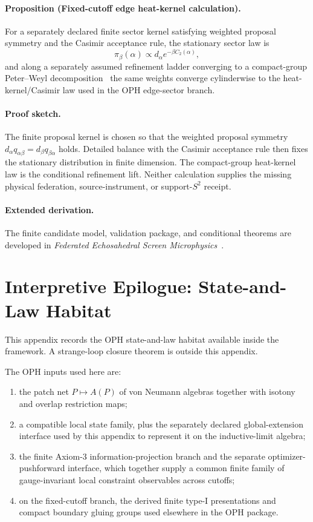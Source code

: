 \paragraph{Proposition (Fixed-cutoff edge heat-kernel calculation).}
For a separately declared finite sector kernel satisfying weighted proposal symmetry and the
Casimir acceptance rule, the stationary sector law is
\[
\pi_\beta(\alpha)\propto d_\alpha e^{-\beta C_2(\alpha)},
\]
and along a separately assumed refinement ladder converging to a compact-group Peter--Weyl
decomposition~\cite{peterWeyl27} the same
weights converge cylinderwise to the heat-kernel/Casimir law used in the OPH edge-sector branch.

\paragraph{Proof sketch.}
The finite proposal kernel is chosen so that the weighted proposal symmetry
\(d_\alpha q_{\alpha\beta}=d_\beta q_{\beta\alpha}\) holds. Detailed balance with the Casimir
acceptance rule then fixes the stationary distribution in finite dimension. The compact-group
heat-kernel law is the conditional refinement lift. Neither calculation supplies the missing
physical federation, source-instrument, or support-\(S^2\) receipt.

\paragraph{Extended derivation.}
The finite candidate model, validation package, and conditional theorems are developed in
\emph{Federated Echosahedral Screen Microphysics}~\cite{ophmicrophysics}.

\section{Interpretive Epilogue: State-and-Law Habitat}

This appendix records the OPH state-and-law habitat available inside the
framework. A strange-loop closure theorem is outside this appendix.

The OPH inputs used here are:
\begin{enumerate}
\item the patch net \(P\mapsto A(P)\) of von Neumann algebras together with isotony and overlap
restriction maps;
\item a compatible local state family, plus the separately declared global-extension interface
used by this appendix to represent it on the inductive-limit algebra;
\item the finite Axiom-3 information-projection branch and the separate optimizer-pushforward
interface, which together supply a common finite family of gauge-invariant local constraint
observables across cutoffs;
\item on the fixed-cutoff branch, the derived finite type-I presentations and compact boundary
gluing groups used elsewhere in the OPH package.
\end{enumerate}

